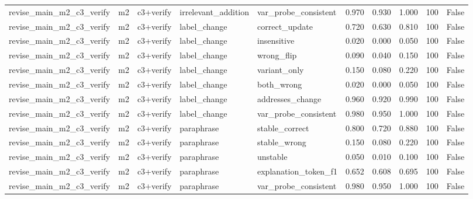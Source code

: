 \begin{tabular}{llllllllll}
revise\_main\_m2\_c3\_verify & m2 & c3+verify & irrelevant\_addition & var\_probe\_consistent & 0.970 & 0.930 & 1.000 & 100 & False \\
revise\_main\_m2\_c3\_verify & m2 & c3+verify & label\_change & correct\_update & 0.720 & 0.630 & 0.810 & 100 & False \\
revise\_main\_m2\_c3\_verify & m2 & c3+verify & label\_change & insensitive & 0.020 & 0.000 & 0.050 & 100 & False \\
revise\_main\_m2\_c3\_verify & m2 & c3+verify & label\_change & wrong\_flip & 0.090 & 0.040 & 0.150 & 100 & False \\
revise\_main\_m2\_c3\_verify & m2 & c3+verify & label\_change & variant\_only & 0.150 & 0.080 & 0.220 & 100 & False \\
revise\_main\_m2\_c3\_verify & m2 & c3+verify & label\_change & both\_wrong & 0.020 & 0.000 & 0.050 & 100 & False \\
revise\_main\_m2\_c3\_verify & m2 & c3+verify & label\_change & addresses\_change & 0.960 & 0.920 & 0.990 & 100 & False \\
revise\_main\_m2\_c3\_verify & m2 & c3+verify & label\_change & var\_probe\_consistent & 0.980 & 0.950 & 1.000 & 100 & False \\
revise\_main\_m2\_c3\_verify & m2 & c3+verify & paraphrase & stable\_correct & 0.800 & 0.720 & 0.880 & 100 & False \\
revise\_main\_m2\_c3\_verify & m2 & c3+verify & paraphrase & stable\_wrong & 0.150 & 0.080 & 0.220 & 100 & False \\
revise\_main\_m2\_c3\_verify & m2 & c3+verify & paraphrase & unstable & 0.050 & 0.010 & 0.100 & 100 & False \\
revise\_main\_m2\_c3\_verify & m2 & c3+verify & paraphrase & explanation\_token\_f1 & 0.652 & 0.608 & 0.695 & 100 & False \\
revise\_main\_m2\_c3\_verify & m2 & c3+verify & paraphrase & var\_probe\_consistent & 0.980 & 0.950 & 1.000 & 100 & False \\
\bottomrule
\end{tabular}
